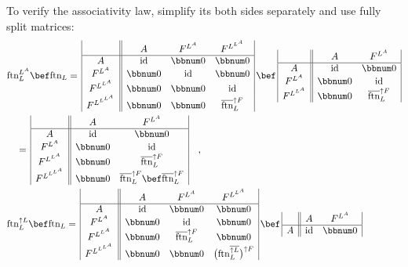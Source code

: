 To verify the associativity law, simplify its both sides separately
and use fully split matrices:
\begin{align*}
 & \text{ftn}_{L}^{L^{A}}\bef\text{ftn}_{L}=\,\begin{array}{|c||ccc|}
 & A & F^{L^{A}} & F^{L^{L^{A}}}\\
\hline A & \text{id} & \bbnum 0 & \bbnum 0\\
F^{L^{A}} & \bbnum 0 & \text{id} & \bbnum 0\\
F^{L^{L^{A}}} & \bbnum 0 & \bbnum 0 & \text{id}\\
F^{L^{L^{L^{A}}}} & \bbnum 0 & \bbnum 0 & \overline{\text{ftn}}_{L}^{\uparrow F}
\end{array}\,\bef\,\begin{array}{|c||cc|}
 & A & F^{L^{A}}\\
\hline A & \text{id} & \bbnum 0\\
F^{L^{A}} & \bbnum 0 & \text{id}\\
F^{L^{L^{A}}} & \bbnum 0 & \overline{\text{ftn}}_{L}^{\uparrow F}
\end{array}\\
 & \quad=\,\begin{array}{|c||cc|}
 & A & F^{L^{A}}\\
\hline A & \text{id} & \bbnum 0\\
F^{L^{A}} & \bbnum 0 & \text{id}\\
F^{L^{L^{A}}} & \bbnum 0 & \overline{\text{ftn}}_{L}^{\uparrow F}\\
F^{L^{L^{L^{A}}}} & \bbnum 0 & \overline{\text{ftn}}_{L}^{\uparrow F}\bef\overline{\text{ftn}}_{L}^{\uparrow F}
\end{array}\quad,\\
 & \text{ftn}_{L}^{\uparrow L}\bef\text{ftn}_{L}=\,\begin{array}{|c||ccc|}
 & A & F^{L^{A}} & F^{L^{L^{A}}}\\
\hline A & \text{id} & \bbnum 0 & \bbnum 0\\
F^{L^{A}} & \bbnum 0 & \text{id} & \bbnum 0\\
F^{L^{L^{A}}} & \bbnum 0 & \overline{\text{ftn}}_{L}^{\uparrow F} & \bbnum 0\\
F^{L^{L^{L^{A}}}} & \bbnum 0 & \bbnum 0 & \big(\text{ftn}_{L}^{\overline{\uparrow L}}\big)^{\uparrow F}
\end{array}\,\bef\,\begin{array}{|c||cc|}
 & A & F^{L^{A}}\\
\hline A & \text{id} & \bbnum 0\\

\end{array}
\end{align*}
